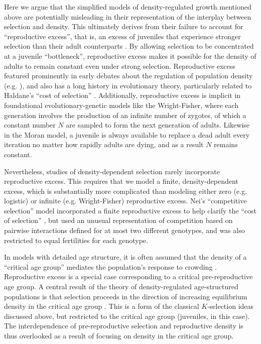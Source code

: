 \documentclass[12pt]{article}
\begin{document}
Here we argue that the simplified models of density-regulated growth mentioned above are potentially misleading in their representation of the interplay between selection and density. This ultimately derives from their failure to account for ``reproductive excess'', that is, an excess of juveniles that experience stronger selection than their adult counterparts \citep{turner1968population}. By allowing selection to be concentrated at a juvenile ``bottleneck'', reproductive excess makes it possible for the density of adults to remain constant even under strong selection. Reproductive excess featured prominently in early debates about the regulation of population density (e.g. \citealt{nicholson_1954}), and also has a long history in evolutionary theory, particularly related to Haldane's ``cost of selection'' \citep{haldane_1957,turner1968population}. Additionally, reproductive excess is implicit in foundational evolutionary-genetic models like the Wright-Fisher, where each generation involves the production of an infinite number of zygotes, of which a constant number $N$ are sampled to form the next generation of adults. Likewise in the Moran model, a juvenile is always available to replace a dead adult every iteration no matter how rapidly adults are dying, and as a result $N$ remains constant. 

Nevertheless, studies of density-dependent selection rarely incorporate reproductive excess. This requires that we model a finite, density-dependent excess, which is substantially more complicated than modeling either zero (e.g. logistic) or infinite (e.g. Wright-Fisher) reproductive excess. Nei's ``competitive selection'' model incorporated a finite reproductive excess to help clarify the ``cost of selection'' \citep{nei1971fertility,nagylaki_1992}, but used an unusual representation of competition based on pairwise interactions defined for at most two different genotypes, and was also restricted to equal fertilities for each genotype. 

In models with detailed age structure, it is often assumed that the density of a ``critical age group'' mediates the population's response to crowding \citep[pp. 54]{charlesworth_1994}. Reproductive excess is a special case corresponding to a critical pre-reproductive age group. A central result of the theory of density-regulated age-structured populations is that selection proceeds in the direction of increasing equilibrium density in the critical age group \citep[pp. 148]{charlesworth_1994}. This is a form of the classical $K$-selection ideas discussed above, but restricted to the critical age group (juveniles, in this case). The interdependence of pre-reproductive selection and reproductive density is thus overlooked as a result of focusing on density in the critical age group. 
\end{document}
